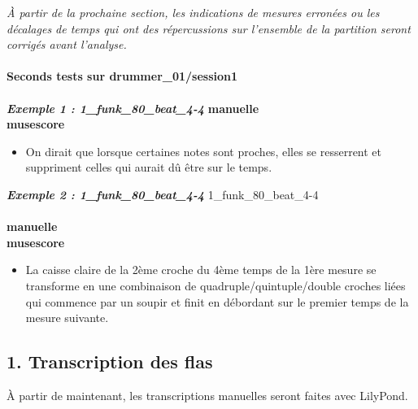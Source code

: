 \textit{À partir de la prochaine section, les indications de mesures erronées ou les décalages de temps qui ont des répercussions sur l’ensemble de la partition seront corrigés avant l’analyse.}\\\\
\textbf{Seconds tests sur drummer\_01/session1}\\\\
\textbf{\textit{Exemple 1 : 1\_funk\_80\_beat\_4-4}}
\textbf{manuelle}\\
\textbf{musescore}\\
\begin{itemize}
	\item On dirait que lorsque certaines notes sont proches, elles se resserrent et suppriment celles qui aurait dû être sur le temps.\\
\end{itemize}
\textbf{\textit{Exemple 2 : 1\_funk\_80\_beat\_4-4}}
1\_funk\_80\_beat\_4-4\\\\
\textbf{manuelle}\\
\textbf{musescore}\\
\begin{itemize}
	\item La caisse claire de la 2ème croche du 4ème temps de la 1ère mesure se transforme en une combinaison de quadruple/quintuple/double croches liées qui commence par un soupir et finit en débordant sur le premier temps de la mesure suivante. 
\end{itemize}
\newpage
\subsection*{1. Transcription des flas}
À partir de maintenant, les transcriptions manuelles seront faites avec LilyPond.
